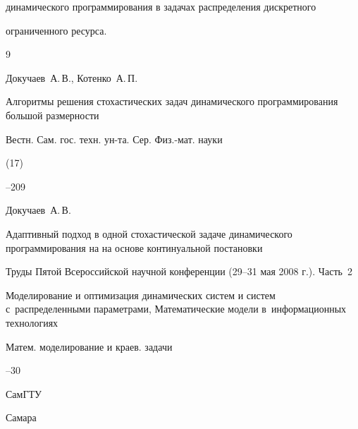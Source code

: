 динамического программирования в задачах распределения дискретного

ограниченного ресурса.







\begin{thebibliography}{9}


\by Докучаев~А.\,В., Котенко~А.\,П.

\paper Алгоритмы решения стохастических задач динамического программирования большой размерности

\jour Вестн. Сам. гос. техн. ун-та. Сер. Физ.-мат. науки


(17)

--209






\by Докучаев~А.\,В.

\paper Адаптивный подход в одной стохастической задаче динамического программирования на на основе континуальной постановки

\inbook Труды Пятой Всероссийской научной конференции {\rm (29--31} мая {\rm 2008} г.{\rm)}. Часть~{\rm 2}

\bookinfo Моделирование и оптимизация динамических систем и систем с~распределенными параметрами, Математические модели в~информационных технологиях

\serial Матем. моделирование и краев. задачи


--30

\publ СамГТУ

\publaddr Самара







\end{thebibliography}



\vspace{-15mm}





\makeengtitle

%

%

%

